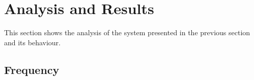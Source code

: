 \section{Analysis and Results}\label{sec:results}
This section shows the analysis of the system presented in the previous section and its behaviour.

\subsection{Frequency}



